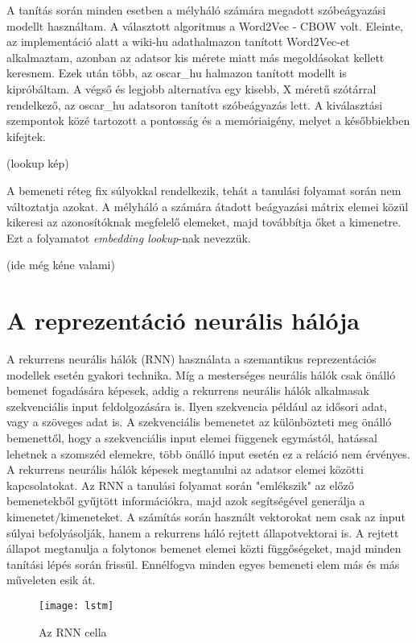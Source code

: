 A tanítás során minden esetben a mélyháló számára megadott szóbeágyazási modellt használtam. A választott algoritmus a Word2Vec - CBOW volt. Eleinte, az implementáció alatt a wiki-hu adathalmazon tanított Word2Vec-et alkalmaztam, azonban az adatsor kis mérete miatt más megoldásokat kellett keresnem.  Ezek után több, az oscar\_hu halmazon tanított modellt is kipróbáltam. A végső és legjobb alternatíva egy kisebb, X méretű szótárral rendelkező, az oscar\_hu adatsoron tanított szóbeágyazás lett. A kiválasztási szempontok közé tartozott a pontosság és a memóriaigény, melyet a későbbiekben kifejtek.

(lookup kép)

A bemeneti réteg fix súlyokkal rendelkezik, tehát a tanulási folyamat során nem változtatja azokat. A mélyháló a számára átadott beágyazási mátrix elemei közül kikeresi az azonosítóknak megfelelő elemeket, majd továbbítja őket a kimenetre. Ezt a folyamatot \textit{embedding lookup}-nak nevezzük.

(ide még kéne valami)

\section{A reprezentáció neurális hálója}

A rekurrens neurális hálók (RNN) használata a szemantikus reprezentációs modellek esetén gyakori technika. Míg a mesterséges neurális hálók csak önálló bemenet fogadására képesek, addig a rekurrens neurális hálók alkalmasak szekvenciális input feldolgozására is. Ilyen szekvencia például az idősori adat, vagy a szöveges adat is. A szekvenciális bemenetet az különbözteti meg önálló bemenettől, hogy a szekvenciális input elemei függenek egymástól, hatással lehetnek a szomszéd elemekre, több önálló input esetén ez a reláció nem érvényes.
A rekurrens neurális hálók képesek megtanulni az adatsor elemei közötti kapcsolatokat. Az RNN a tanulási folyamat során "emlékszik" az előző bemenetekből gyűjtött információkra, majd azok segítségével generálja a kimenetet/kimeneteket. A számítás során használt vektorokat nem csak az input súlyai befolyásolják, hanem a rekurrens háló rejtett állapotvektorai is. A rejtett állapot megtanulja a folytonos bemenet elemei közti függőségeket, majd minden tanítási lépés során frissül. Ennélfogva minden egyes bemeneti elem más és más műveleten esik át.

\begin{figure}[H]
	\centering
	\texttt{[image: lstm]}
	\caption{Az RNN cella}
\end{figure}

